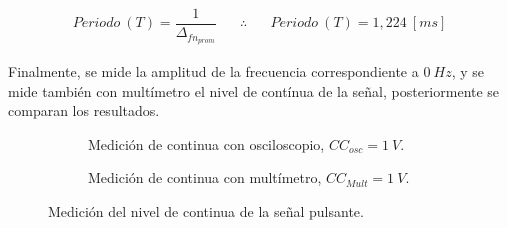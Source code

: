       \begin{align*}
        Periodo~\left( T \right)=\dfrac{1}{\Delta_{fn_{prom}}} \hspace{20pt} \therefore \hspace{20pt} \boxed{Periodo~\left( T \right)=1,224~[ms]}
      \end{align*}

      Finalmente, se mide la amplitud de la frecuencia correspondiente a $0~Hz$, y se mide 
      también con multímetro el nivel de contínua de la señal, posteriormente se comparan 
      los resultados.

       \begin{figure}[H]
        \centering
        \begin{subfigure}[H]{0.48\textwidth}
          \caption{Medición de continua con osciloscopio, $CC_{osc}=1~V$.}
        \end{subfigure}
        \hfill
        \begin{subfigure}[H]{0.48\textwidth}
          \caption{Medición de continua con multímetro, $CC_{Mult}=1~V$.}
        \end{subfigure}

        \caption{Medición del nivel de continua de la señal pulsante.}
        \label{fig:Exp2SeñalPulsanteContinua}
      \end{figure}        